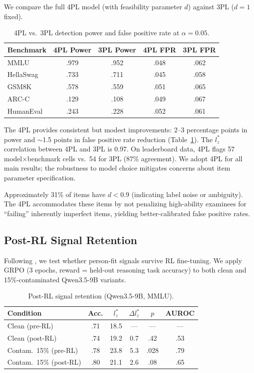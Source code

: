 \documentclass[11pt,a4paper]{article}
\begin{document}
We compare the full 4PL model (with feasibility parameter $d$) against 3PL ($d=1$ fixed).

\begin{table}[t]
\centering
\caption{4PL vs.\ 3PL detection power and false positive rate at $\alpha=0.05$.}
\label{tab:4pl-3pl}
\small
\begin{tabular}{lcccc}
\toprule
\textbf{Benchmark} & \textbf{4PL Power} & \textbf{3PL Power} & \textbf{4PL FPR} & \textbf{3PL FPR} \\
\midrule
MMLU      & .979 & .952 & .048 & .062 \\
HellaSwag & .733 & .711 & .045 & .058 \\
GSM8K     & .578 & .559 & .051 & .065 \\
ARC-C     & .129 & .108 & .049 & .067 \\
HumanEval & .243 & .228 & .052 & .061 \\
\bottomrule
\end{tabular}
\end{table}

The 4PL provides consistent but modest improvements: 2--3 percentage points in power and $\sim$1.5 points in false positive rate reduction (Table~\ref{tab:4pl-3pl}).
The $l_{z}^{*}$ correlation between 4PL and 3PL is 0.97.
On leaderboard data, 4PL flags 57 model$\times$benchmark cells vs.\ 54 for 3PL (87\% agreement).
We adopt 4PL for all main results; the robustness to model choice mitigates concerns about item parameter specification.

Approximately 31\% of items have $d < 0.9$ (indicating label noise or ambiguity).
The 4PL accommodates these items by not penalizing high-ability examinees for ``failing'' inherently imperfect items, yielding better-calibrated false positive rates.

\subsection{Post-RL Signal Retention}
\label{sec:post-rl}

Following \citet{wang2025postrl}, we test whether person-fit signals survive RL fine-tuning.
We apply GRPO (3 epochs, reward = held-out reasoning task accuracy) to both clean and 15\%-contaminated Qwen3.5-9B variants.

\begin{table}[t]
\centering
\caption{Post-RL signal retention (Qwen3.5-9B, MMLU).}
\label{tab:post-rl}
\small
\begin{tabular}{lccccc}
\toprule
\textbf{Condition} & \textbf{Acc.} & $l_{z}^{*}$ & $\Delta l_{z}^{*}$ & \textbf{$p$} & \textbf{AUROC} \\
\midrule
Clean (pre-RL)          & .71 & 18.5 & ---  & ---  & --- \\
Clean (post-RL)         & .74 & 19.2 & 0.7  & .42  & .53 \\
Contam.\ 15\% (pre-RL) & .78 & 23.8 & 5.3  & .028 & .79 \\
Contam.\ 15\% (post-RL) & .80 & 21.1 & 2.6  & .08  & .65 \\
\bottomrule
\end{tabular}
\end{table}
\end{document}
